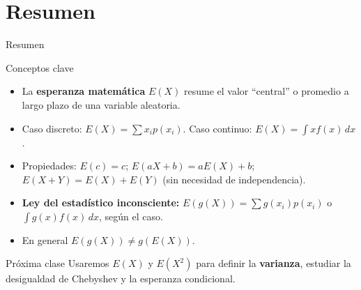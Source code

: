 \documentclass[aspectratio=169,11pt]{beamer}
\begin{document}
\section{Resumen}

\begin{frame}{Resumen}
\begin{block}{Conceptos clave}
\begin{itemize}
\item La \textbf{esperanza matemática} $E(X)$ resume el valor ``central'' o promedio a largo plazo de una variable aleatoria.
\item Caso discreto: $E(X) = \sum x_i p(x_i)$. Caso continuo: $E(X) = \int x f(x)\, dx$.
\item Propiedades: $E(c)=c$; $E(aX+b) = aE(X)+b$; $E(X+Y) = E(X)+E(Y)$ (sin necesidad de independencia).
\item \textbf{Ley del estadístico inconsciente:} $E(g(X)) = \sum g(x_i)p(x_i)$ o $\int g(x) f(x)\, dx$, según el caso.
\item En general $E(g(X)) \neq g(E(X))$.
\end{itemize}
\end{block}

\begin{alertblock}{Próxima clase}
Usaremos $E(X)$ y $E(X^2)$ para definir la \textbf{varianza}, estudiar la desigualdad de Chebyshev y la esperanza condicional.
\end{alertblock}
\end{frame}
\end{document}
